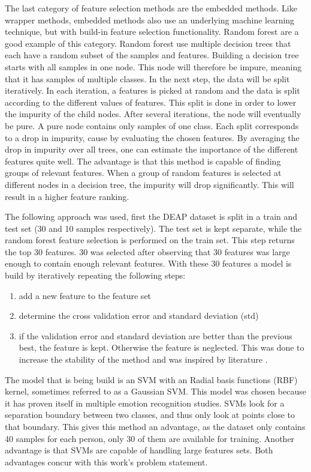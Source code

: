 \documentclass[11pt,journal,compsoc]{IEEEtran}
\newcommand{\npar}{\par \vspace{2.3ex plus 0.3ex minus 0.3ex}}
\begin{document}
The last category of feature selection methods are the embedded methods. Like wrapper methods, embedded methods also use an underlying machine learning technique, but with build-in feature selection functionality. Random forest are a good example of this category. Random forest use multiple decision trees that each have a random subset of the samples and features\citep{rfPaper}. Building a decision tree starts with all samples in one node. This node will therefore be impure, meaning that it has samples of multiple classes. In the next step, the data will be split iteratively. In each iteration, a features is picked at random and the data is split according to the different values of features. This split is done in order to lower the impurity of the child nodes. After several iterations, the node will eventually be pure. A pure node contains only samples of one class. Each split corresponds to a drop in impurity, cause by evaluating the chosen features. By averaging the drop in impurity over all trees, one can estimate the importance of the different features quite well. The advantage is that this method is capable of finding groups of relevant features. When a group of random features is selected at different nodes in a decision tree, the impurity will drop significantly. This will result in a higher feature ranking.

\npar

The following approach was used, first the DEAP dataset is split in a train and test set (30 and 10 samples respectively). The test set is kept separate, while the random forest feature selection is performed on the train set. This step returns the top 30 features. 30 was selected after observing that 30 features was large enough to contain enough relevant features. With these 30 features a model is build by iteratively repeating the following steps:
\begin{enumerate}
\item add a new feature to the feature set
\item determine the cross validation error and standard deviation (std)
\item if the validation error and standard deviation are better than the previous best, the feature is kept. Otherwise the feature is neglected. This was done to increase the stability of the method and was inspired by literature \citep{rfPaper}.
\end{enumerate}
The model that is being build is an SVM with an Radial basis functions (RBF) kernel, sometimes referred to as a Gaussian SVM. This model was chosen because it has proven itself in multiple emotion recognition studies\citep{killyPaper,emorecoghard,SVMUsage,SVMUsage2}. SVMs look for a separation boundary between two classes, and thus only look at points close to that boundary. This gives this method an advantage, as the dataset only contains 40 samples for each person, only 30 of them are available for training. Another advantage is that SVMs are capable of handling large features sets\citep{SVMLargeFeatSets,SVMLargeFeatSets2}. Both advantages concur with this work's problem statement. 
\end{document}
